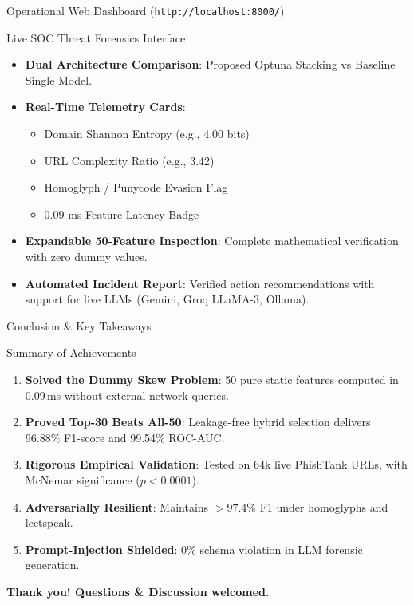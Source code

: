 \documentclass[aspectratio=169,10pt]{beamer}
\begin{document}
\begin{frame}{Operational Web Dashboard (\texttt{http://localhost:8000/})}
    \begin{block}{Live SOC Threat Forensics Interface}
        \begin{itemize}
            \item \textbf{Dual Architecture Comparison}: Proposed Optuna Stacking vs Baseline Single Model.
            \item \textbf{Real-Time Telemetry Cards}:
                \begin{itemize}
                    \item Domain Shannon Entropy (e.g., 4.00 bits)
                    \item URL Complexity Ratio (e.g., 3.42)
                    \item Homoglyph / Punycode Evasion Flag
                    \item 0.09 ms Feature Latency Badge
                \end{itemize}
            \item \textbf{Expandable 50-Feature Inspection}: Complete mathematical verification with zero dummy values.
            \item \textbf{Automated Incident Report}: Verified action recommendations with support for live LLMs (Gemini, Groq LLaMA-3, Ollama).
        \end{itemize}
    \end{block}
\end{frame}

\begin{frame}{Conclusion \& Key Takeaways}
    \begin{exampleblock}{Summary of Achievements}
        \begin{enumerate}
            \item \textbf{Solved the Dummy Skew Problem}: 50 pure static features computed in 0.09\,ms without external network queries.
            \item \textbf{Proved Top-30 Beats All-50}: Leakage-free hybrid selection delivers 96.88\% F1-score and 99.54\% ROC-AUC.
            \item \textbf{Rigorous Empirical Validation}: Tested on 64k live PhishTank URLs, with McNemar significance ($p < 0.0001$).
            \item \textbf{Adversarially Resilient}: Maintains $> 97.4\%$ F1 under homoglyphs and leetspeak.
            \item \textbf{Prompt-Injection Shielded}: 0\% schema violation in LLM forensic generation.
        \end{enumerate}
    \end{exampleblock}
    \begin{center}
        \textbf{Thank you! Questions \& Discussion welcomed.}
    \end{center}
\end{frame}
\end{document}
